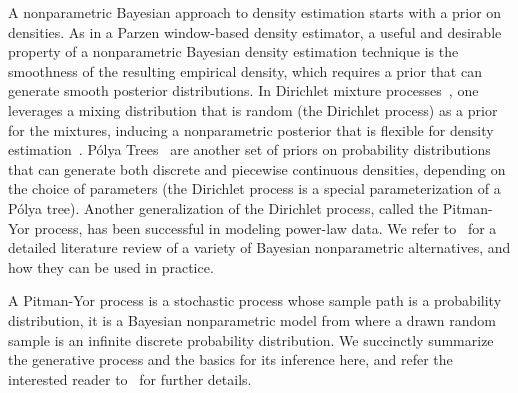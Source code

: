 A nonparametric Bayesian approach to density estimation starts with a prior on densities.
As in a Parzen window-based density estimator, a useful and desirable property of a nonparametric Bayesian density estimation technique is the smoothness of the resulting empirical density, which requires a prior that can generate smooth posterior distributions.
In Dirichlet mixture processes~\citep{j-Escobar1995}, one leverages a mixing distribution that is random (\eg the Dirichlet process) as a prior for the mixtures, inducing a nonparametric posterior that is flexible for density estimation~\citep{j-Ghosal2010}.
P\'{o}lya Trees~\citep{j-Mauldin1992} are another set of priors on probability distributions that can generate both discrete and piecewise continuous densities, depending on the choice of parameters (the Dirichlet process is a special parameterization of a P\'{o}lya tree). Another generalization of the Dirichlet process, called the Pitman-Yor process, has been successful in modeling power-law data. 
We refer to~\citep{j-Gershman2012} for a detailed literature review of a variety of Bayesian nonparametric alternatives, and how they can be used in practice.

A Pitman-Yor process is a stochastic process whose sample path is a probability distribution, \ie it is a Bayesian nonparametric model from where a drawn random sample is an infinite discrete probability distribution. 
We succinctly summarize the generative process and the basics for its inference here, and refer the interested reader to~\citet{j-Teh2010} for further details.

